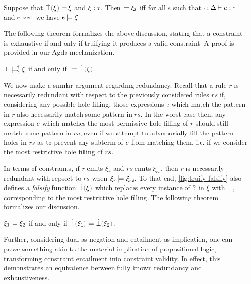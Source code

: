  \begin{definition}
 	\label{definition:valid-constraint}
 	Suppose that $\ctruify{\xi}=\xi$ and $\xi : \tau$.
 	Then $\models \xi_2$ iff for all $e$ such that $\cdot \mathbin{;} \Delta \vdash e : \tau$ and $e ~\mathtt{val}$ we have $e \models \xi$
 \end{definition}

The following theorem formalizes the above discussion, stating that a constraint is exhaustive if and only if truifying it produces a valid constraint. A proof is provided in our Agda mechanization.

\begin{theorem}
	\label{theorem:exhaustive-truify}
	$\top \models_{?}^{\dag} \xi$ if and only if $\ccsatisfy{\;}{\ctruify{\xi}}$.
\end{theorem}

We now make a similar argument regarding redundancy. Recall that a rule $r$ is necessarily redundant with respect to the previously considered rules $rs$ if, considering any possible hole filling, those expressions $e$ which match the pattern in $r$ also necessarily match some pattern in $rs$. In the worst case then, any expression $e$ which matches the most permissive hole filling of $r$ should still match some pattern in $rs$, even if we attempt to adversarially fill the pattern holes in $rs$ as to prevent any subterm of $e$ from matching them, i.e. if we consider the most restrictive hole filling of $rs$.

In terms of constraints, if $r$ emits $\xi_r$ and $rs$ emits $\xi_{rs}$, then $r$ is necessarily redundant with repsect to $rs$ when $\xi_r \models \xi_{rs}$. To that end, \autoref{fig:truify-falsify} also defines a \emph{falsify} function $\cfalsify{\xi}$ which replaces every instance of $\mathtt{?}$ in $\xi$ with $\bot$, corresponding to the most restrictive hole filling. The following theorem formalizes our discussion.

\begin{theorem}
	\label{theorem:redundant-truify-falsify}
	$\xi_1 \models \xi_2$ if and only if $\ccsatisfy{\ctruify{\xi_1}}{\cfalsify{\xi_2}}$.
\end{theorem}

Further, considering dual as negation and entailment as implication, one can prove something akin to the material implication of propositional logic, transforming constraint entailment into constraint validity. In effect, this demonstrates an equivalence between fully known redundancy and exhaustiveness.


